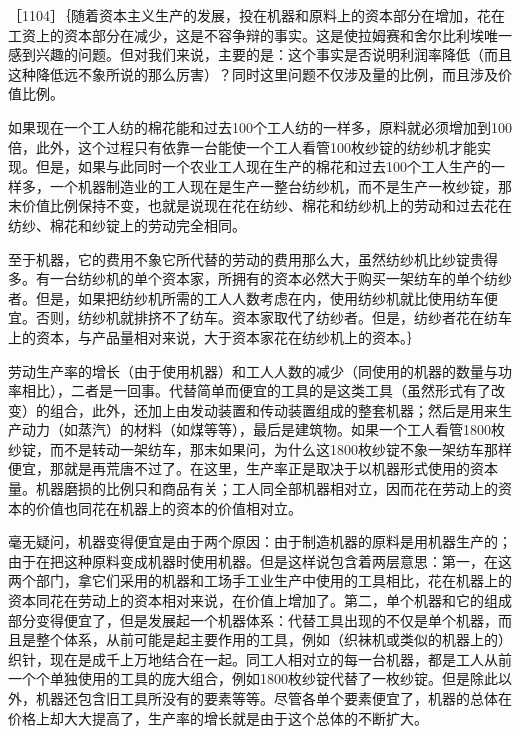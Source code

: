 
［1104］｛随着资本主义生产的发展，投在机器和原料上的资本部分在增加，花在工资上的资本部分在减少，这是不容争辩的事实。这是使拉姆赛和舍尔比利埃唯一感到兴趣的问题。但对我们来说，主要的是：这个事实是否说明利润率降低（而且这种降低远不象所说的那么厉害）？同时这里问题不仅涉及量的比例，而且涉及价值比例。

如果现在一个工人纺的棉花能和过去100个工人纺的一样多，原料就必须增加到100倍，此外，这个过程只有依靠一台能使一个工人看管100枚纱锭的纺纱机才能实现。但是，如果与此同时一个农业工人现在生产的棉花和过去100个工人生产的一样多，一个机器制造业的工人现在是生产一整台纺纱机，而不是生产一枚纱锭，那末价值比例保持不变，也就是说现在花在纺纱、棉花和纺纱机上的劳动和过去花在纺纱、棉花和纱锭上的劳动完全相同。

至于机器，它的费用不象它所代替的劳动的费用那么大，虽然纺纱机比纱锭贵得多。有一台纺纱机的单个资本家，所拥有的资本必然大于购买一架纺车的单个纺纱者。但是，如果把纺纱机所需的工人人数考虑在内，使用纺纱机就比使用纺车便宜。否则，纺纱机就排挤不了纺车。资本家取代了纺纱者。但是，纺纱者花在纺车上的资本，与产品量相对来说，大于资本家花在纺纱机上的资本。｝

劳动生产率的增长（由于使用机器）和工人人数的减少（同使用的机器的数量与功率相比），二者是一回事。代替简单而便宜的工具的是这类工具（虽然形式有了改变）的组合，此外，还加上由发动装置和传动装置组成的整套机器；然后是用来生产动力（如蒸汽）的材料（如煤等等），最后是建筑物。如果一个工人看管1800枚纱锭，而不是转动一架纺车，那末如果问，为什么这1800枚纱锭不象一架纺车那样便宜，那就是再荒唐不过了。在这里，生产率正是取决于以机器形式使用的资本量。机器磨损的比例只和商品有关；工人同全部机器相对立，因而花在劳动上的资本的价值也同花在机器上的资本的价值相对立。

毫无疑问，机器变得便宜是由于两个原因：由于制造机器的原料是用机器生产的；由于在把这种原料变成机器时使用机器。但是这样说包含着两层意思：第一，在这两个部门，拿它们采用的机器和工场手工业生产中使用的工具相比，花在机器上的资本同花在劳动上的资本相对来说，在价值上增加了。第二，单个机器和它的组成部分变得便宜了，但是发展起一个机器体系：代替工具出现的不仅是单个机器，而且是整个体系，从前可能是起主要作用的工具，例如（织袜机或类似的机器上的）织针，现在是成千上万地结合在一起。同工人相对立的每一台机器，都是工人从前一个个单独使用的工具的庞大组合，例如1800枚纱锭代替了一枚纱锭。但是除此以外，机器还包含旧工具所没有的要素等等。尽管各单个要素便宜了，机器的总体在价格上却大大提高了，生产率的增长就是由于这个总体的不断扩大。


